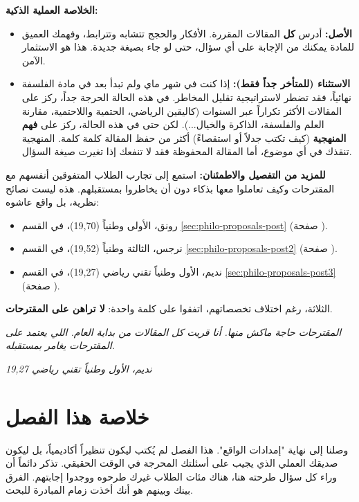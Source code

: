 \documentclass[12pt,a4paper]{book}
\newcommand{\quoteAr}[1]{%
	\begin{myquote}
		\itshape #1
	\end{myquote}
}
\begin{document}
	\textbf{الخلاصة العملية الذكية:}
	\begin{itemize}
		\item \textbf{الأصل:} أدرس \textbf{كل} المقالات المقررة. الأفكار والحجج تتشابه وتترابط، وفهمك العميق للمادة يمكنك من الإجابة على أي سؤال، حتى لو جاء بصيغة جديدة. هذا هو الاستثمار الآمن.
		\item \textbf{الاستثناء (للمتأخر جداً فقط):} إذا كنت في شهر ماي ولم تبدأ بعد في مادة الفلسفة نهائياً، فقد تضطر لاستراتيجية تقليل المخاطر. في هذه الحالة الحرجة جداً، ركز على المقالات الأكثر تكراراً عبر السنوات (كاليقين الرياضي، الحتمية واللاحتمية، مقارنة العلم والفلسفة، الذاكرة والخيال...). لكن حتى في هذه الحالة، ركز على \textbf{فهم المنهجية} (كيف تكتب جدلاً أو استقصاءً) أكثر من حفظ المقالة كلمة كلمة. المنهجية تنقذك في أي موضوع، أما المقالة المحفوظة فقد لا تنفعك إذا تغيرت صيغة السؤال.
	\end{itemize}
	
	\textbf{للمزيد من التفصيل والاطمئنان:}
	استمع إلى تجارب الطلاب المتفوقين أنفسهم مع المقترحات وكيف تعاملوا معها بذكاء دون أن يخاطروا بمستقبلهم. هذه ليست نصائح نظرية، بل واقع عاشوه:
	\begin{itemize}
		\item رونق، الأولى وطنياً (19,70)، في القسم \ref{sec:philo-proposals-post} (صفحة \pageref{sec:philo-proposals-post}).
		\item نرجس، الثالثة وطنياً (19,52)، في القسم \ref{sec:philo-proposals-post2} (صفحة \pageref{sec:philo-proposals-post2}).
		\item نديم، الأول وطنياً تقني رياضي (19,27)، في القسم \ref{sec:philo-proposals-post3} (صفحة \pageref{sec:philo-proposals-post3}).
	\end{itemize}
	
	الثلاثة، رغم اختلاف تخصصاتهم، اتفقوا على كلمة واحدة: \textbf{لا تراهن على المقترحات}.
	
	\quoteAr{المقترحات حاجة ماكش منها. أنا قريت كل المقالات من بداية العام. اللي يعتمد على المقترحات يغامر بمستقبله.}
	\textit{ نديم، الأول وطنياً تقني رياضي 19,27}
	
	\section{خلاصة هذا الفصل}
	
	وصلنا إلى نهاية "إمدادات الواقع". هذا الفصل لم يُكتب ليكون تنظيراً أكاديمياً، بل ليكون صديقك العملي الذي يجيب على أسئلتك المحرجة في الوقت الحقيقي. تذكر دائماً أن وراء كل سؤال طرحته هنا، هناك مئات الطلاب غيرك طرحوه ووجدوا إجابتهم. الفرق بينك وبينهم هو أنك أخذت زمام المبادرة للبحث.
	
\end{document}
